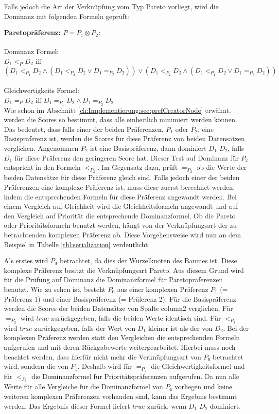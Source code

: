 Falls jedoch die Art der Verknüpfung vom Typ Pareto vorliegt, wird die Dominanz mit folgenden Formeln geprüft:

\textbf{Paretopräferenz:} $P = P_1 \otimes P_2:$ \\ \\
Dominanz Formel:\\
$D_1  <_P D_2$ iff $(D_1 <_{P_1} D_2 \land (D_1 <_{P_2} D_2 \lor D_1 =_{P_2} D_2)) \lor (D_1 <_{P_2} D_2 \land (D_1 <_{P_1} D_2 \lor D_1 =_{P_1} D_2))$ \\ \\
Gleichwertigkeits Formel: \\
$D_1 =_P D_2$ iff $D_1 =_{P_1} D_2 \land D_1 =_{P_2} D_2$ \\

Wie schon im Abschnitt \ref{ch:Implementierung:sec:prefCreatorNode} erwähnt, werden die Scores so bestimmt, dass alle einheitlich minimiert werden können. Das bedeutet, dass falls einer der beiden Präferenzen, $P_1$ oder $P_2$, eine Basispräferenz ist, werden die Scores für diese Präferenz von beiden Datensätzen verglichen. Angenommen $P_2$ ist eine Basispräferenz, dann dominiert $D_1$ $D_2$, falls $D_1$ für diese Präferenz den geringeren Score hat. Dieser Test auf Dominanz für $P_2$ entspricht in den Formeln $<_ {P_2}$. Im Gegensatz dazu, prüft $=_{P_2}$ ob die Werte der beiden Datensätze für diese Präferenz gleich sind. 
Falls jedoch einer der beiden Präferenzen eine komplexe Präferenz ist, muss diese zuerst berechnet werden, indem die entsprechenden Formeln für diese Präferenz angewandt werden. Bei einem Vergleich auf Gleichheit wird die Gleichheitsformeln angewandt und auf den Vergleich auf Priorität die entsprechende Dominanzformel. Ob die Pareto oder Prioritätsformeln benutzt werden, hängt von der Verknüpfungsart der zu betrachtenden komplexen Präferenz ab. Diese Vorgehensweise wird nun an dem Beispiel in Tabelle \ref{tbl:serialization} verdeutlicht.

Als erstes wird $P_0$ betrachtet, da dies der Wurzelknoten des Baumes ist. Diese komplexe Präferenz besitzt die Verknüpfungsart Pareto. Aus diesem Grund wird für die Prüfung auf Dominanz die Dominanzformel für Paretopräferenzen benutzt. Wie zu sehen ist, besteht $P_0$ aus einer komplexen Präferenz $P_1$ (= Präferenz 1) und einer Basispräferenz (= Präferenz 2). Für die Basispräferenz werden die Scores der beiden Datensätze von Spalte column2 verglichen. Für $=_{P_2}$ wird $true$ zurückgegeben, falls die beiden Werte identisch sind. Für $<_{P_2}$ wird $true$ zurückgegeben, falls der Wert von $D_1$ kleiner ist als der von $D_2$.
Bei der komplexen Präferenz werden statt den Vergleichen die entsprechenden Formeln aufgerufen und mit deren Rückgabewerte weitergearbeitet. Hierbei muss noch  beachtet werden, dass hierfür nicht mehr die Verknüpfungsart von $P_0$ betrachtet wird, sondern die von $P_1$. Deshalb wird für $=_{P_1}$ die Gleichwertigkeitsformel und für $<_{P_1}$ die Dominanzformel für Prioritätspräferenzen aufgerufen. 
Da nun alle Werte für alle Vergleiche für die Dominanzformel von $P_0$ vorliegen und keine weiteren komplexen Präferenzen vorhanden sind, kann das Ergebnis bestimmt werden. Das Ergebnis dieser Formel liefert $true$ zurück, wenn $D_1$ $D_2$ dominiert.

